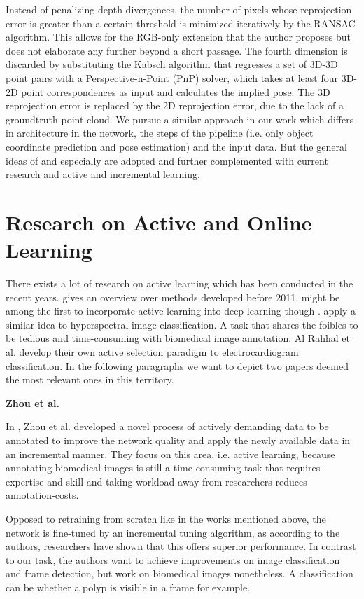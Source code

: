 Instead of penalizing depth divergences, the number of pixels whose reprojection error is greater than a certain threshold is minimized iteratively by the RANSAC algorithm. This allows for the RGB-only extension that the author proposes but does not elaborate any further beyond a short passage. The fourth dimension is discarded by substituting the Kabsch algorithm that regresses a set of 3D-3D point pairs with a Perspective-n-Point (PnP) solver, which takes at least four 3D-2D point correspondences as input and calculates the implied pose. The 3D reprojection error is replaced by the 2D reprojection error, due to the lack of a groundtruth point cloud. We pursue a similar approach in our work which differs in architecture in the network, the steps of the pipeline (i.e. only object coordinate prediction and pose estimation) and the input data. But the general ideas of \cite{pertsch} and especially \cite{brachmann1} are adopted and further complemented with current research and active and incremental learning.

\section{Research on Active and Online Learning}

There exists a lot of research on active learning which has been conducted in the recent years. \cite{activesurvey} gives an overview over methods developed before 2011. \cite{dwang} might be among the first to incorporate active learning into deep learning though \cite{zhou}. \cite{hyperspectral} apply a similar idea to hyperspectral image classification. A task that shares the foibles to be tedious and time-consuming with biomedical image annotation. Al Rahhal et al. develop their own active selection paradigm to electrocardiogram classification. In the following paragraphs we want to depict two papers deemed the most relevant ones in this territory.

\quad \textbf{Zhou et al.}

In \cite{zhou}, Zhou et al. developed a novel process of actively demanding data to be annotated to improve the network quality and apply the newly available data in an incremental manner. They focus on this area, i.e. active learning, because annotating biomedical images is still a time-consuming task that requires expertise and skill and taking workload away from researchers reduces annotation-costs.

Opposed to retraining from scratch like in the works mentioned above, the network is fine-tuned by an incremental tuning algorithm, as according to the authors, researchers have shown that this offers superior performance. In contrast to our task, the authors want to achieve improvements on image classification and frame detection, but work on biomedical images nonetheless. A classification can be whether a polyp is visible in a frame for example. 

